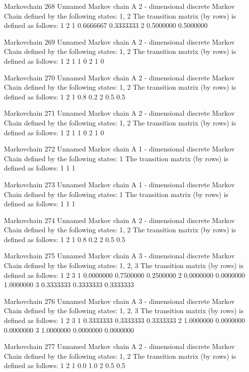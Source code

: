 \documentclass[
  nojss]{jss}
\begin{document}
\begin{CodeChunk}
\begin{CodeOutput}
Markovchain  268 
Unnamed Markov chain 
 A  2 - dimensional discrete Markov Chain defined by the following states: 
 1, 2 
 The transition matrix  (by rows)  is defined as follows: 
          1         2
1 0.6666667 0.3333333
2 0.5000000 0.5000000

Markovchain  269 
Unnamed Markov chain 
 A  2 - dimensional discrete Markov Chain defined by the following states: 
 1, 2 
 The transition matrix  (by rows)  is defined as follows: 
  1 2
1 1 0
2 1 0

Markovchain  270 
Unnamed Markov chain 
 A  2 - dimensional discrete Markov Chain defined by the following states: 
 1, 2 
 The transition matrix  (by rows)  is defined as follows: 
    1   2
1 0.8 0.2
2 0.5 0.5

Markovchain  271 
Unnamed Markov chain 
 A  2 - dimensional discrete Markov Chain defined by the following states: 
 1, 2 
 The transition matrix  (by rows)  is defined as follows: 
  1 2
1 1 0
2 1 0

Markovchain  272 
Unnamed Markov chain 
 A  1 - dimensional discrete Markov Chain defined by the following states: 
 1 
 The transition matrix  (by rows)  is defined as follows: 
  1
1 1

Markovchain  273 
Unnamed Markov chain 
 A  1 - dimensional discrete Markov Chain defined by the following states: 
 1 
 The transition matrix  (by rows)  is defined as follows: 
  1
1 1

Markovchain  274 
Unnamed Markov chain 
 A  2 - dimensional discrete Markov Chain defined by the following states: 
 1, 2 
 The transition matrix  (by rows)  is defined as follows: 
    1   2
1 0.8 0.2
2 0.5 0.5

Markovchain  275 
Unnamed Markov chain 
 A  3 - dimensional discrete Markov Chain defined by the following states: 
 1, 2, 3 
 The transition matrix  (by rows)  is defined as follows: 
          1         2         3
1 0.0000000 0.7500000 0.2500000
2 0.0000000 0.0000000 1.0000000
3 0.3333333 0.3333333 0.3333333

Markovchain  276 
Unnamed Markov chain 
 A  3 - dimensional discrete Markov Chain defined by the following states: 
 1, 2, 3 
 The transition matrix  (by rows)  is defined as follows: 
          1         2         3
1 0.3333333 0.3333333 0.3333333
2 1.0000000 0.0000000 0.0000000
3 1.0000000 0.0000000 0.0000000

Markovchain  277 
Unnamed Markov chain 
 A  2 - dimensional discrete Markov Chain defined by the following states: 
 1, 2 
 The transition matrix  (by rows)  is defined as follows: 
    1   2
1 0.0 1.0
2 0.5 0.5


\end{CodeOutput}
\end{CodeChunk}
\end{document}
